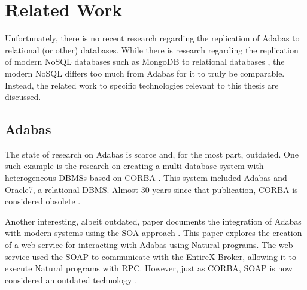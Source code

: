 \chapter{Related Work}
\label{ch03:litreview}
Unfortunately, there is no recent research regarding the replication of Adabas to relational (or other) databases. While there is research regarding the replication of modern NoSQL databases such as MongoDB to relational databases \cite{aftabnosqletltordbms}, the modern NoSQL differs too much from Adabas for it to truly be comparable. Instead, the related work to specific technologies relevant to this thesis are discussed.

\section{Adabas}
\label{ch03:litreview:adabas}
The state of research on Adabas is scarce and, for the most part, outdated. One such example is the research on creating a multi-database system with heterogeneous \ac{DBMS}s based on \ac{CORBA} \cite{ozhan1996making}. This system included Adabas and Oracle7, a relational \ac{DBMS}. Almost 30 years since that publication, \ac{CORBA} is considered obsolete \cite{fallofcorba}.

Another interesting, albeit outdated, paper documents the integration of Adabas with modern systems using the \ac{SOA} approach \cite{koschelmainframemodernization}. This paper explores the creation of a web service for interacting with Adabas using Natural programs. The web service used the \ac{SOAP} to communicate with the EntireX Broker, allowing it to execute Natural programs with \ac{RPC}. However, just as \ac{CORBA}, \ac{SOAP} is now considered an outdated technology \cite{soapoutdated}.

